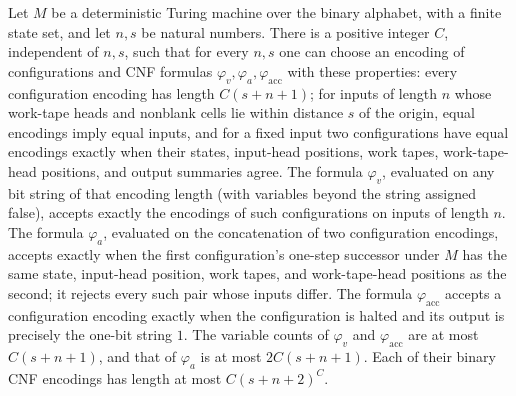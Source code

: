 \begin{theorem}
\label{Complexity.exists_adjacency_codec_cnf}
\leanok
{}
Let $M$ be a deterministic Turing machine over the binary alphabet, with a finite state
set, and let $n,s$ be natural numbers. There is a positive integer $C$, independent of
$n,s$, such that for every $n,s$ one can choose an encoding of configurations and CNF
formulas $\varphi_v,\varphi_a,\varphi_{\mathrm{acc}}$ with these properties: every
configuration encoding has length $C(s+n+1)$; for inputs of length $n$ whose work-tape
heads and nonblank cells lie within distance $s$ of the origin, equal encodings imply
equal inputs, and for a fixed input two configurations have equal encodings exactly when
their states, input-head positions, work tapes, work-tape-head positions, and output
summaries agree. The formula $\varphi_v$, evaluated on any bit string of that encoding
length (with variables beyond the string assigned false), accepts exactly the encodings
of such configurations on inputs of length $n$. The formula $\varphi_a$, evaluated on
the concatenation of two configuration encodings, accepts exactly when the first
configuration's one-step successor under $M$ has the same state, input-head position,
work tapes, and work-tape-head positions as the second; it rejects every such pair whose
inputs differ. The formula $\varphi_{\mathrm{acc}}$ accepts a configuration encoding
exactly when the configuration is halted and its output is precisely the one-bit string
$1$. The variable counts of $\varphi_v$ and $\varphi_{\mathrm{acc}}$ are at most
$C(s+n+1)$, and that of $\varphi_a$ is at most $2C(s+n+1)$. Each of their binary CNF
encodings has length at most $C(s+n+2)^C$.
\end{theorem}

